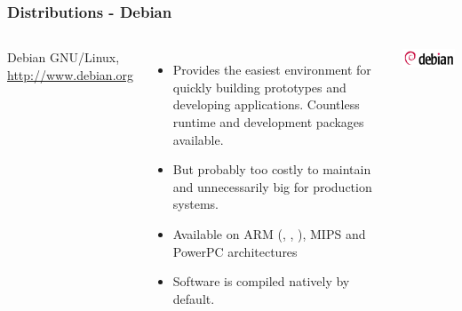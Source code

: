 \begin{frame}
  \frametitle{Distributions - Debian}
  \small
  \begin{columns}[T]
    Debian GNU/Linux, \url{http://www.debian.org}
    \begin{itemize}
    \item Provides the easiest environment for quickly building prototypes
          and developing applications. Countless runtime and
          development packages available.
    \item But probably too costly to maintain
          and unnecessarily big for production systems.
    \item Available on ARM (, , ),
          MIPS and PowerPC architectures
    \item Software is compiled natively by default.
    \end{itemize}
    \includegraphics[width=\textwidth]{slides/sysdev-embedded-linux/debian.png}\\
  \end{columns}
\end{frame}

